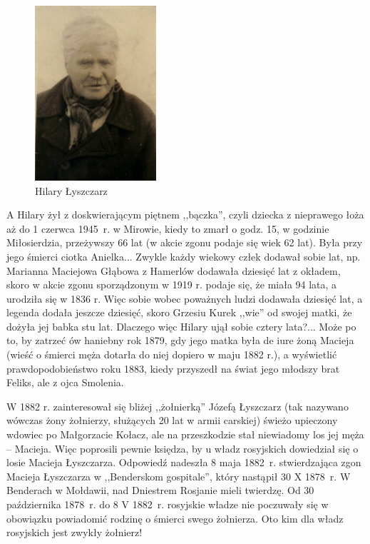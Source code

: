 \begin{figure}[!h]
\begin{center}
\includegraphics[width=0.4\textwidth]{zdjecia/hilary_lyszczarz.jpg}
\caption{Hilary Łyszczarz}
\label{rys:hilary_lyszczarz}
\end{center}
\end{figure}

A Hilary żył z doskwierającym piętnem ,,bączka'', czyli dziecka z nieprawego łoża aż do 1 czerwca 1945~r. w Mirowie, kiedy to zmarł o godz. 15, w godzinie Miłosierdzia, przeżywszy 66 lat (w akcie zgonu podaje się wiek 62 lat). Była przy jego śmierci ciotka Anielka... Zwykle każdy wiekowy człek dodawał sobie lat, np. Marianna Maciejowa Głąbowa z Hamerlów dodawała dziesięć lat z okładem, skoro w akcie zgonu sporządzonym w 1919 r. podaje się, że miała 94 lata, a urodziła się w 1836 r. Więc sobie  wobec poważnych ludzi dodawała dziesięć lat, a legenda dodała jeszcze dziesięć, skoro Grzesiu Kurek ,,wie'' od swojej matki, że dożyła jej babka stu lat. Dlaczego więc Hilary ujął sobie cztery lata?... Może po to, by zatrzeć ów haniebny rok 1879, gdy jego matka była de iure żoną Macieja (wieść o śmierci męża dotarła do niej dopiero w maju 1882 r.), a wyświetlić prawdopodobieństwo roku 1883, kiedy przyszedł na świat jego młodszy brat Feliks, ale z ojca Smolenia.

W 1882 r. zainteresował się bliżej ,,żołnierką'' Józefą Łyszczarz (tak nazywano wówczas żony żołnierzy, służących 20 lat w armii carskiej) świeżo upieczony wdowiec po Małgorzacie Kołacz, ale na przeszkodzie stał niewiadomy los jej męża -- Macieja. Więc poprosili pewnie księdza, by u władz rosyjskich dowiedział się o losie Macieja Łyszczarza. Odpowiedź nadeszła 8 maja 1882~r. stwierdzająca zgon Macieja Łyszczarza w ,,Benderskom gospitale'', który nastąpił 30 X 1878~r. W Benderach w Mołdawii, nad Dniestrem Rosjanie mieli twierdzę. Od 30 października 1878~r. do 8 V 1882~r. rosyjskie władze nie poczuwały się w obowiązku powiadomić rodzinę o śmierci swego żołnierza. Oto kim dla władz rosyjskich jest zwykły żołnierz!


